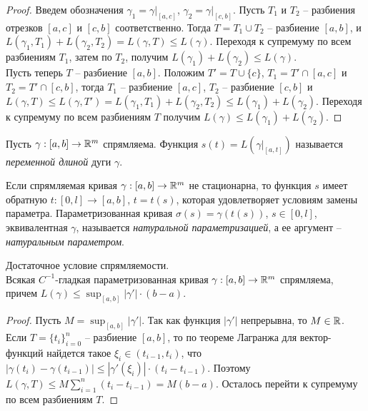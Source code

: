     \begin{proof}
        Введем обозначения $\gamma_{1} = \gamma|_{[a, c]}$, $\gamma_{2} = \gamma|_{[c, b]}$. Пусть $T_{1}$ и $T_{2}$ -- разбиения отрезков $[a, c]$ и $[c, b]$ соответственно. Тогда $T = T_{1} \cup T_{2}$ -- разбиение $[a, b]$, и $L(\gamma_{1}, T_{1}) + L(\gamma_{2}, T_{2}) = L(\gamma, T) \leq L(\gamma)$. Переходя к супремуму по всем разбиениям $T_{1}$, затем по $T_{2}$, получим $L(\gamma_{1}) + L(\gamma_{2}) \leq L(\gamma)$.\\
        Пусть теперь $T$ -- разбиение $[a, b]$. Положим $T' = T \cup \{c\}$, $T_{1} = T' \cap [a, c]$ и $T_{2} = T' \cap [c, b]$, тогда $T_{1}$ -- разбиение $[a, c]$, $T_{2}$ -- разбиение $[c, b]$ и $L(\gamma, T) \leq L(\gamma, T') = L(\gamma_{1}, T_{1}) + L(\gamma_{2}, T_{2}) \leq L(\gamma_{1}) + L(\gamma_{2})$. Переходя к супремуму по всем разбиениям $T$ получим $L(\gamma) \leq L(\gamma_{1}) + L(\gamma_{2})$. 
    \end{proof}
    
    \begin{definition}
        Пусть $\gamma: [a, b] \to \mathbb{R}^m$ спрямляема. Функция $s(t) = L(\gamma|_{[a, t]})$ называется \textit{переменной длиной} дуги $\gamma$.
    \end{definition}
    
    Если спрямляемая кривая $\gamma: [a, b] \to \mathbb{R}^m$ не стационарна, то функция $s$ имеет обратную $t: [0, l] \to [a, b]$, $t = t(s)$, которая удовлетворяет условиям замены параметра. Параметризованная кривая $\sigma(s) = \gamma(t(s))$, $s \in [0, l]$, эквивалентная $\gamma$, называется \textit{натуральной параметризацией}, а ее аргумент -- \textit{натуральным параметром}.
    
    \begin{lemma}{Достаточное условие спрямляемости.}\\
        Всякая $C^{-1}$-гладкая параметризованная кривая $\gamma: [a, b] \to \mathbb{R}^m$ спрямляема, причем $L(\gamma) \leq \sup_{[a, b]} |\gamma'| \cdot (b - a)$.
    \end{lemma}
    
    \begin{proof}
        Пусть $M = \sup_{[a, b]}|\gamma'|$. Так как функция $|\gamma'|$ непрерывна, то $M \in \mathbb{R}$. Если $T = \{t_{i}\}_{i = 0}^{n}$ -- разбиение $[a, b]$, то по теореме Лагранжа для вектор-функций найдется такое $\xi_{i} \in (t_{i-1}, t_{i})$, что $|\gamma(t_{i}) - \gamma(t_{i-1})| \leq |\gamma'(\xi_{i})|\cdot(t_{i} - t_{i - 1})$. Поэтому $L(\gamma, T) \leq M \sum_{i = 1}^{n}(t_{i} - t_{i - 1}) = M(b - a)$. Осталось перейти к супремуму по всем разбиениям $T$. 
    \end{proof}
    
